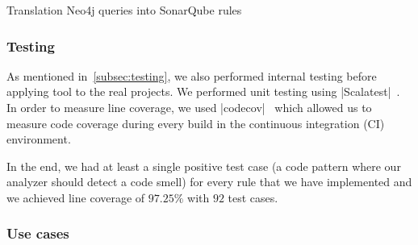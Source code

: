 \begin{algorithm}
    \label{translation_algorithm}
    \caption{Translation Neo4j queries into SonarQube rules}
    \BlankLine

\end{algorithm}

\subsubsection{Testing}



As mentioned in~\ref{subsec:testing}, we also performed internal testing before applying tool to the real projects.
We performed unit testing using \verbatim|Scalatest|~\cite{scalatest}.
In order to measure line coverage, we used \verbatim|codecov|~\cite{codecov} which allowed us to measure
code coverage during every build in the continuous integration (CI) environment.

In the end, we had at least a single positive test case (a code pattern where our analyzer should detect a code smell)
for every rule that we have implemented and we achieved line coverage of $97.25\%$ with $92$ test cases.

\subsubsection{Use cases}


